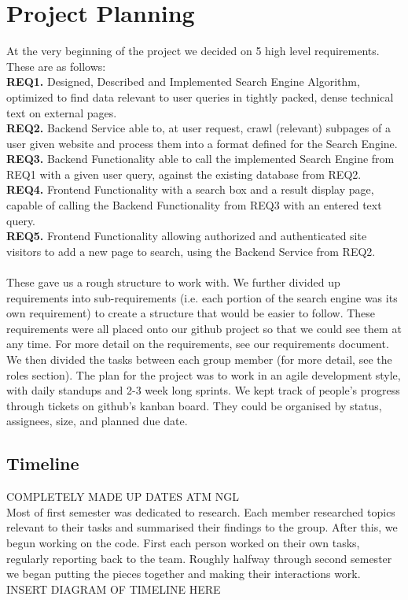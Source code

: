 \section{Project Planning}
At the very beginning of the project we decided on 5 high level requirements. These are as follows: \\
\textbf{REQ1.} Designed, Described and Implemented Search Engine Algorithm, optimized to find data relevant to user queries in tightly packed, dense technical text on external pages. \\
\textbf{REQ2.} Backend Service able to, at user request, crawl (relevant) subpages of a user given website and process them into a format defined for the Search Engine. \\
\textbf{REQ3.} Backend Functionality able to call the implemented Search Engine from REQ1 with a given user query, against the existing database from REQ2. \\
\textbf{REQ4.} Frontend Functionality with a search box and a result display page, capable of calling the Backend Functionality from REQ3 with an entered text query. \\
\textbf{REQ5.} Frontend Functionality allowing authorized and authenticated site visitors to add a new page to search, using the Backend Service from REQ2.\\ \\

These gave us a rough structure to work with. We further divided up requirements into sub-requirements (i.e. each portion of the search engine was its own requirement) to create a structure that would be easier to follow. These requirements were all placed onto our github project so that we could see them at any time. For more detail on the requirements, see our requirements document. \\
We then divided the tasks between each group member (for more detail, see the roles section). The plan for the project was to work in an agile development style, with daily standups and 2-3 week long sprints. We kept track of people's progress through tickets on github's kanban board. They could be organised by status, assignees, size, and planned due date.\\

\subsection{Timeline}
COMPLETELY MADE UP DATES ATM NGL \\
Most of first semester was dedicated to research. Each member researched topics relevant to their tasks and summarised their findings to the group. After this, we begun working on the code. First each person worked on their own tasks, regularly reporting back to the team. Roughly halfway through second semester we began putting the pieces together and making their interactions work. \\
INSERT DIAGRAM OF TIMELINE HERE 
